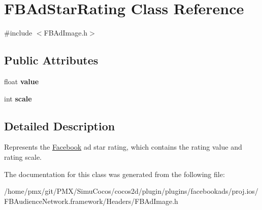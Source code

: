 \hypertarget{structFBAdStarRating}{}\section{F\+B\+Ad\+Star\+Rating Class Reference}
\label{structFBAdStarRating}


{\ttfamily \#include $<$F\+B\+Ad\+Image.\+h$>$}

\subsection*{Public Attributes}
\begin{DoxyCompactItemize}
\item 
\mbox{\label{structFBAdStarRating_a503b6a953a23bd8b8b342453b294ba6c}} 
float {\bfseries value}
\item 
\mbox{\label{structFBAdStarRating_a721bb7032bf376b5fd3712e4eb86b625}} 
int {\bfseries scale}
\end{DoxyCompactItemize}


\subsection{Detailed Description}
Represents the \hyperlink{interfaceFacebook}{Facebook} ad star rating, which contains the rating value and rating scale. 

The documentation for this class was generated from the following file\+:\begin{DoxyCompactItemize}
\item 
/home/pmx/git/\+P\+M\+X/\+Simu\+Cocos/cocos2d/plugin/plugins/facebookads/proj.\+ios/\+F\+B\+Audience\+Network.\+framework/\+Headers/F\+B\+Ad\+Image.\+h\end{DoxyCompactItemize}
